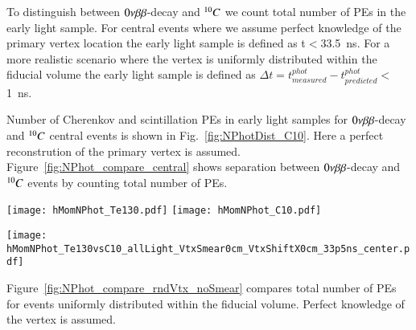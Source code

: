 To distinguish between $0\nu\beta\beta$-decay and $^{10}C$ we count total number of PEs in the 
early light sample. For central events where we assume perfect knowledge of the 
primary vertex location the early light sample is defined as t$<$33.5~ns. For a more 
realistic scenario where the vertex is uniformly distributed within the fiducial volume
the early light sample is defined as $\Delta t=t^{phot}_{measured} - 
t^{phot}_{predicted}<$1~ns.


Number of Cherenkov and scintillation PEs in early light samples for $0\nu\beta\beta$-decay and 
$^{10}C$ central events is shown in Fig.~\ref{fig:NPhotDist_C10}. Here a perfect 
reconstrution of the primary vertex is assumed. Figure~\ref{fig:NPhot_compare_central} shows
separation between $0\nu\beta\beta$-decay and $^{10}C$ events by counting total number of PEs. 

\begin{figure*}[ht]
  \centering
  \texttt{[image: hMomNPhot\_Te130.pdf]}
  \texttt{[image: hMomNPhot\_C10.pdf]}
  \caption{Early photons. Number of Cherenkov (\emph{dashed red line}), 
    scintillation
    (\emph{dotted blue line}), and total (\emph{solid black line}) PEs
    for the simulation of 1000 $^{130}$Te 0{\nbb} decay (left panel)
    and of 648 $^{10}$C (\emph{right panel}) events (1000 $^{10}$C events was 
    generated, but selected only those that has total energy deposition in the 
    detector in the range between 2.1 and 2.9~MeV).}
\label{fig:NPhotDist_C10}
\end{figure*}



\begin{figure*}[ht]
  \centering
  \texttt{[image: hMomNPhot\_Te130vsC10\_allLight\_VtxSmear0cm\_VtxShiftX0cm\_33p5ns\_center.pdf]}
  \caption{Comparison of total number of early photons between $^{130}$Te 0{\nbb} decay 
    and $^{10}$C events with energy deposition in the range between 2.1 and 2.9~MeV. 
    Events originated at the center of the sphere.
    Perfect vertex reconstruction - true vertex position is used. Time cut of 
    33.5~ns on the photon arrival time is applied.}
\label{fig:NPhot_compare_central}
\end{figure*}


Figure~\ref{fig:NPhot_compare_rndVtx_noSmear} compares total number of PEs for events uniformly 
distributed within the fiducial volume. Perfect knowledge of the vertex is assumed.

